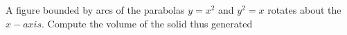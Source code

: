 
%
%
%
%
% 
% 

\question A figure bounded by arcs of the parabolas $y=x^2$ and $y^2=x$ rotates
about the $x-axis$. Compute the volume of the solid thus generated

\insertQR{}

